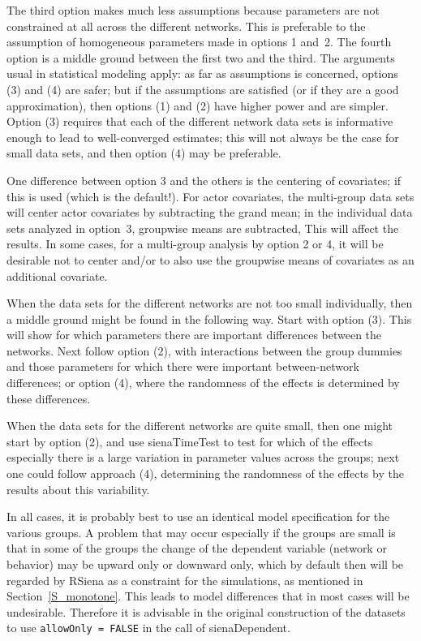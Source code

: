 \documentclass[a4paper,fleqn,11pt]{article}
\newcommand{\+}{\, + \,}
\newcommand{\RS}{{\sf \textsf{RSiena} }}
\begin{document}
The third option makes much less assumptions because parameters are not
constrained at all across the different networks.
This is preferable to the assumption of homogeneous parameters
made in options 1 and~2.
The fourth option is a middle ground between the first two and the third.
The arguments usual in statistical modeling apply:
as far as assumptions is concerned, options (3) and (4) are safer;
but if the assumptions are satisfied (or if they are a good approximation),
then options (1) and (2) have higher power and are simpler.
Option (3) requires that each of the different network data sets
is informative enough to lead to well-converged estimates;
this will not always be the case for small data sets,
and then option (4) may be preferable.

One difference between option 3 and the others is the centering of covariates;
if this is used (which is the default!).
For actor covariates, the multi-group data sets will center actor covariates
by subtracting the grand mean; in the individual data sets analyzed in option~3,
groupwise means are subtracted, This will affect the results.
In some cases, for a multi-group analysis by option 2 or 4, it will be desirable
not to center and/or to also use the groupwise means of covariates
as an additional covariate.

When the data sets for the different networks are not too small
individually,
then a middle ground might be found in the following way.
Start with option (3). This will show for which parameters there are
important differences between the networks.
Next follow option (2), with interactions between the group dummies
and those parameters for which there were important between-network
differences; or option (4), where the randomness of the effects
is determined by these differences.

When the data sets for the different networks are quite small,
then one might start by option (2), and use \textsf{sienaTimeTest} to test
for which of the effects especially there is a large variation in
parameter values across the groups;
next one could follow approach (4), determining the randomness of the effects
by the results about this variability.

In all cases, it is probably best to use an identical model specification
for the various groups. A problem that may occur especially if the groups
are small is that in some of the groups the change of the dependent variable
(network or behavior) may be upward only or downward only, which by default
then will be regarded by \RS as a constraint for the simulations,
as mentioned in Section~\ref{S_monotone}.
This leads to model differences that in most cases will be undesirable.
Therefore it is advisable in the original construction of the datasets
to use \texttt{allowOnly = FALSE} in the call of \textsf{sienaDependent}.
\end{document}
